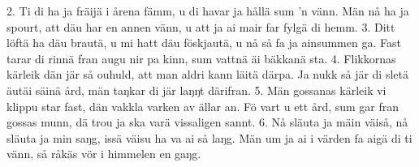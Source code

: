 2.  Ti di ha ja fräijä i årena fämm,
    u di havar ja hållä sum ’n vänn.
    Män nå ha ja spourt, att däu har en annen vänn,
    u att ja ai mair far fylgä di hemm.
3.  Ditt löftä ha däu brautä, u mi hatt däu föskjautä,
    u nå så fa ja ainsummen ga.
    Fast tarar di rinnä fran augu nir pa kinn,
    sum vattnä äi bäkkanä sta.
4.  Flikkornas kärleik dän jär så ouhuld,
    att man aldri kann läitä därpa.
    Ja nukk så jär di sletä äutäi säinä ård,
    män taŋkar di jär laŋŋt därifran.
5.  Män gossanas kärleik vi klippu star fast,
    dän vakkla varken av ällar an.
    Fö vart u ett ård, sum gar fran gossas munn,
    dä trou ja ska varä vissaligen sannt.
6.  Nå släuta ja mäin väiså, nå släuta ja min saŋg,
    issä väisu ha va ai så laŋg.
    Män um ja ai i värden fa aigä di ti vänn,
    så råkäs vör i himmelen en gaŋg.

